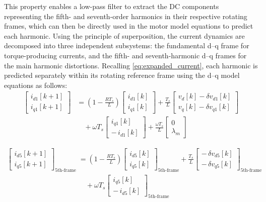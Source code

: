 This property enables a low-pass filter to extract the DC components representing the fifth- and seventh-order harmonics in their respective rotating frames, which can then be directly used in the motor model equations to predict each harmonic.
Using the principle of superposition, the current dynamics are decomposed into three independent subsystems: the fundamental d–q frame for torque-producing currents, and the fifth- and seventh-harmonic d–q frames for the main harmonic distortions. Recalling \ref{eq:expanded_current}, each harmonic is predicted separately within its rotating reference frame using the d–q model equations as follows:
\begin{equation}
\begin{aligned}
\begin{bmatrix}
i_{d1}[k+1]\\
i_{q1}[k+1]
\end{bmatrix}
&=
\left(1 - \frac{R T_s}{L}\right)
\begin{bmatrix}
i_{d1}[k]\\
i_{q1}[k]
\end{bmatrix}
+
\frac{T_s}{L}
\begin{bmatrix}
v_d[k] - \delta v_{d1}[k]\\
v_q[k] - \delta v_{q1}[k]
\end{bmatrix}\\
&\quad
+ \omega T_s
\begin{bmatrix}
i_{q1}[k]\\
-\,i_{d1}[k]
\end{bmatrix}
+
\frac{\omega T_s}{L}
\begin{bmatrix}
0\\
\lambda_m
\end{bmatrix}
\end{aligned}
\label{eq:id1_predict}
\end{equation}

\begin{equation}
\begin{aligned}
\begin{bmatrix}
i_{d5}[k+1]\\
i_{q5}[k+1]
\end{bmatrix}_{\text{5th-frame}}
&=
\left(1 - \frac{R T_s}{L}\right)
\begin{bmatrix}
i_{d5}[k]\\
i_{q5}[k]
\end{bmatrix}_{\text{5th-frame}}
+
\frac{T_s}{L}
\begin{bmatrix}
-\,\delta v_{d5}[k]\\
-\,\delta v_{q5}[k]
\end{bmatrix}_{\text{5th-frame}}\\
&\quad
+ \omega T_s
\begin{bmatrix}
i_{q5}[k]\\
-\,i_{d5}[k]
\end{bmatrix}_{\text{5th-frame}}
\end{aligned}
\label{eq:id5_predict}
\end{equation}

